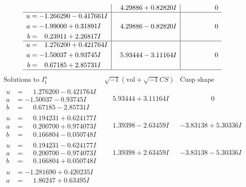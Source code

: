 \documentclass[1p]{elsarticle_modified}
\theoremstyle{definition}
\newcommand{\I}{\sqrt{-1}}
\begin{document}
$$\begin{array}{c|c|c}
 & \phantom{-}4.29886 + 0.82820 I & \phantom{-0.000000 } 0 \\ \hline\begin{aligned}
u &= -1.266290 - 0.417661 I \\
a &= -1.99000 + 0.31891 I \\
b &= \phantom{-}0.23911 + 2.26817 I\end{aligned}
 & \phantom{-}4.29886 - 0.82820 I & \phantom{-0.000000 } 0 \\ \hline\begin{aligned}
u &= \phantom{-}1.276200 + 0.421764 I \\
a &= -1.50037 + 0.93745 I \\
b &= \phantom{-}0.67185 + 2.85731 I\end{aligned}
 & \phantom{-}5.93444 - 3.11164 I & \phantom{-0.000000 } 0\\
 \hline 
 \end{array}$$\newpage$$\begin{array}{c|c|c}  
\text{Solutions to }I^u_{1}& \I (\text{vol} + \sqrt{-1}CS) & \text{Cusp shape}\\
 \hline 
\begin{aligned}
u &= \phantom{-}1.276200 - 0.421764 I \\
a &= -1.50037 - 0.93745 I \\
b &= \phantom{-}0.67185 - 2.85731 I\end{aligned}
 & \phantom{-}5.93444 + 3.11164 I & \phantom{-0.000000 } 0 \\ \hline\begin{aligned}
u &= \phantom{-}0.194231 + 0.624177 I \\
a &= \phantom{-}0.200700 + 0.974073 I \\
b &= \phantom{-}0.166804 - 0.050748 I\end{aligned}
 & \phantom{-}1.39398 - 2.63459 I & -3.83138 + 5.30336 I \\ \hline\begin{aligned}
u &= \phantom{-}0.194231 - 0.624177 I \\
a &= \phantom{-}0.200700 - 0.974073 I \\
b &= \phantom{-}0.166804 + 0.050748 I\end{aligned}
 & \phantom{-}1.39398 + 2.63459 I & -3.83138 - 5.30336 I \\ \hline\begin{aligned}
u &= -1.281690 + 0.420235 I \\
a &= \phantom{-}1.86247 + 0.63495 I \\

\end{aligned}
\end{array}$$
\end{document}
